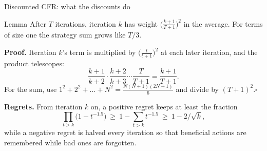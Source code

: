 \documentclass[10pt,aspectratio=169]{beamer}
\begin{document}
\begin{frame}{Discounted CFR: what the discounts do}
\begin{block}{Lemma}
After $T$ iterations, iteration $k$ has weight $\big(\tfrac{k+1}{T+1}\big)^{2}$ in the average. For terms of size one the strategy
sum grows like $T/3$.
\end{block}
\pause
\textbf{Proof.} Iteration $k$'s term is multiplied by $\big(\tfrac{t}{t+1}\big)^2$ at each later iteration, and the product telescopes:
\[ \frac{k+1}{k+2}\cdot\frac{k+2}{k+3}\cdots\frac{T}{T+1}=\frac{k+1}{T+1} . \]
For the sum, use $1^2+2^2+\dots+N^2=\tfrac{N(N+1)(2N+1)}6$ and divide by $(T+1)^2$.\hfill$\square$

\pause
\textbf{Regrets.} From iteration $k$ on, a positive regret keeps at least the fraction
\[ \textstyle\prod_{t>k}\big(1-t^{-1.5}\big)\ \ge\ 1-\sum_{t>k}t^{-1.5}\ \ge\ 1-2/\sqrt k , \]
while a negative regret is halved every iteration so that beneficial actions are remembered while bad ones are forgotten.
\end{frame}
\end{document}
